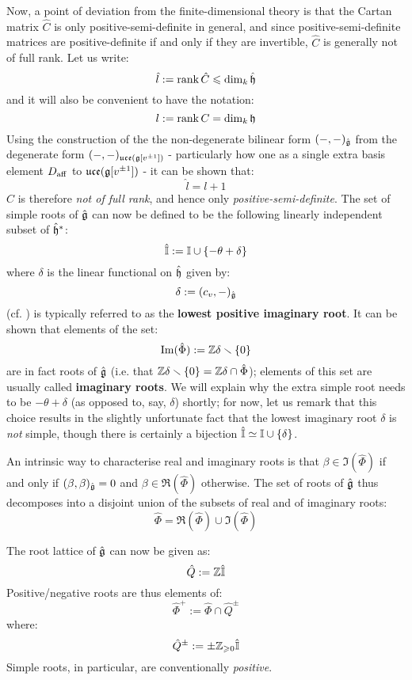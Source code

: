         Now, a point of deviation from the finite-dimensional theory is that the Cartan matrix $\hat{C}$ is only positive-semi-definite in general, and since positive-semi-definite matrices are positive-definite if and only if they are invertible, $\hat{C}$ is generally not of full rank. Let us write:
            $$\hat{l} := \operatorname{rank} \hat{C} \leqslant \dim_k \hat{\mathfrak{h}}$$
        and it will also be convenient to have the notation:
            $$l := \operatorname{rank} C = \dim_k \mathfrak{h}$$
        Using the construction of the the non-degenerate bilinear form $(-, -)_{\hat{\mathfrak{g}}}$ from the degenerate form $(-, -)_{\mathfrak{uce}(\mathfrak{g}[v^{\pm 1}])}$ - particularly how one as a single extra basis element $D_{\mathrm{aff}}$ to $\mathfrak{uce}(\mathfrak{g}[v^{\pm 1}])$ - it can be shown that:
            $$\hat{l} = l + 1$$
        $\hat{C}$ is therefore \textit{not of full rank}, and hence only \textit{positive-semi-definite}. The set of simple roots of $\hat{\mathfrak{g}}$ can now be defined to be the following linearly independent subset of $\hat{\mathfrak{h}}^*$:
            $$\hat{\mathbb{I}} := \mathbb{I} \cup \{-\theta + \delta\}$$
        where $\delta$ is the linear functional on $\hat{\mathfrak{h}}$ given by:
            $$\delta := (c_v, -)_{\hat{\mathfrak{g}}}$$
        (cf. \cite[Section 7.4, p. 100]{kac_infinite_dimensional_lie_algebras}) is typically referred to as the \textbf{lowest positive imaginary root}. It can be shown that elements of the set:
            $$\operatorname{Im}(\hat{\Phi}) := \mathbb{Z}\delta \smallsetminus \{0\}$$
        are in fact roots of $\hat{\mathfrak{g}}$ (i.e. that $\mathbb{Z}\delta \smallsetminus \{0\} = \mathbb{Z}\delta \cap \hat{\Phi}$); elements of this set are usually called \textbf{imaginary roots}. We will explain why the extra simple root needs to be $-\theta + \delta$ (as opposed to, say, $\delta$) shortly; for now, let us remark that this choice results in the slightly unfortunate fact that the lowest imaginary root $\delta$ is \textit{not} simple, though there is certainly a bijection $\hat{\mathbb{I}} \simeq \mathbb{I} \cup \{\delta\}$.

        An intrinsic way to characterise real and imaginary roots is that $\beta \in \Im(\hat{\Phi})$ if and only if $(\beta, \beta)_{\hat{\mathfrak{g}}} = 0$ and $\beta \in \Re(\hat{\Phi})$ otherwise. The set of roots of $\hat{\mathfrak{g}}$ thus decomposes into a disjoint union of the subsets of real and of imaginary roots:
            $$\hat{\Phi} = \Re(\hat{\Phi}) \cup \Im(\hat{\Phi})$$
        
        The root lattice of $\hat{\mathfrak{g}}$ can now be given as:
            $$\hat{Q} := \mathbb{Z}\hat{\mathbb{I}}$$
        Positive/negative roots are thus elements of:
            $$\hat{\Phi}^+ := \hat{\Phi} \cap \hat{Q}^{\pm}$$
        where:
            $$\hat{Q}^{\pm} := \pm\mathbb{Z}_{\geqslant 0}\hat{\mathbb{I}}$$
        Simple roots, in particular, are conventionally \textit{positive}.

